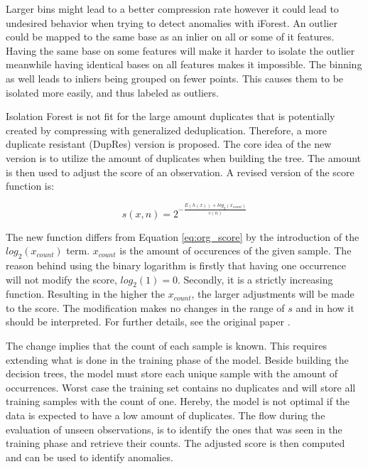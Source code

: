 Larger bins might lead to a better compression rate however it could lead to undesired behavior when trying to detect anomalies with iForest. An outlier could be mapped to the same base as an inlier on all or some of it features. Having the same base on some features will make it harder to isolate the outlier meanwhile having identical bases on all features makes it impossible. The binning as well leads to inliers being grouped on fewer points. This causes them to be isolated more easily, and thus labeled as outliers.

Isolation Forest is not fit for the large amount duplicates that is potentially created by compressing with generalized deduplication. Therefore, a more duplicate resistant (DupRes) version is proposed. The core idea of the new version is to utilize the amount of duplicates when building the tree. The amount is then used to adjust the score of an observation. A revised version of the score function is:

\begin{equation}
  s(x,n) = 2^{-\frac{E(h(x))+log_2(x_{count})}{c(n)}}
  \label{eq:dupres_score}
\end{equation}

The new function differs from Equation \ref{eq:org_score} by the introduction of the $log_2(x_{count})$ term. $x_{count}$ is the amount of occurences of the given sample. The reason behind using the binary logarithm is firstly that having one occurrence will not modify the score, $log_2(1)=0$. Secondly, it is a strictly increasing function. Resulting in the higher the $x_{count}$, the larger adjustments will be made to the score. The modification makes no changes in the range of $s$ and in how it should be interpreted. For further details, see the original paper \cite{iforest}.

The change implies that the count of each sample is known. This requires extending what is done in the training phase of the model. Beside building the decision trees, the model must store each unique sample with the amount of occurrences. Worst case the training set contains no duplicates and will store all training samples with the count of one. Hereby, the model is not optimal if the data is expected to have a low amount of duplicates. The flow during the evaluation of unseen observations, is to identify the ones that was seen in the training phase and retrieve their counts. The adjusted score is then computed and can be used to identify anomalies.

% 

